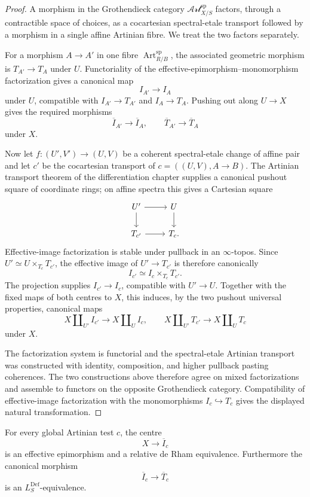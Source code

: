 \begin{proof}
A morphism in the Grothendieck category
$\mathscr{Art}^{\mathrm{sp}}_{X/S}$ factors, through a contractible space of
choices, as a cocartesian spectral-etale transport followed by a morphism in a
single affine Artinian fibre.  We treat the two factors separately.

For a morphism $A\to A'$ in one fibre
$\operatorname{Art}^{\mathrm{sp}}_{R/B}$, the associated geometric morphism is
$T_{A'}\to T_A$ under $U$.  Functoriality of the
effective-epimorphism--monomorphism factorization gives a canonical map
\[
    I_{A'}\longrightarrow I_A
\]
under $U$, compatible with $I_{A'}\to T_{A'}$ and $I_A\to T_A$.  Pushing out
along $U\to X$ gives the required morphisms
\[
    \overline I_{A'}\longrightarrow\overline I_A,
    \qquad
    \overline T_{A'}\longrightarrow\overline T_A
\]
under $X$.

Now let
$f:(U',V')\to(U,V)$ be a coherent spectral-etale change of affine pair and
let $c'$ be the cocartesian transport of
$c=((U,V),A\to B)$.  The Artinian transport theorem of the differentiation
chapter supplies a canonical pushout square of coordinate rings; on affine
spectra this gives a Cartesian square
\[
\begin{tikzcd}
U' \arrow[r] \arrow[d] & U \arrow[d]\\
T_{c'} \arrow[r] & T_c.
\end{tikzcd}
\]
Effective-image factorization is stable under pullback in an $\infty$-topos.
Since $U'\simeq U\times_{T_c}T_{c'}$, the effective image of
$U'\to T_{c'}$ is therefore canonically
\[
    I_{c'}\simeq I_c\times_{T_c}T_{c'}.
\]
The projection supplies $I_{c'}\to I_c$, compatible with $U'\to U$.  Together
with the fixed maps of both centres to $X$, this induces, by the two pushout
universal properties, canonical maps
\[
    X\amalg_{U'}I_{c'}\longrightarrow X\amalg_UI_c,
    \qquad
    X\amalg_{U'}T_{c'}\longrightarrow X\amalg_UT_c
\]
under $X$.

The factorization system is functorial and the spectral-etale Artinian
transport was constructed with identity, composition, and higher pullback
pasting coherences.  The two constructions above therefore agree on mixed
factorizations and assemble to functors on the opposite Grothendieck category.
Compatibility of effective-image factorization with the monomorphisms
$I_c\hookrightarrow T_c$ gives the displayed natural transformation.
\end{proof}

\begin{proposition}
\label{prop:bnli-induced-cell-formal-effective}
For every global Artinian test $c$, the centre
\[
    X\longrightarrow\overline I_c
\]
is an effective epimorphism and a relative de Rham equivalence.
Furthermore the canonical morphism
\[
    \overline I_c\longrightarrow\overline T_c
\]
is an $L_S^{\mathrm{Def}}$-equivalence.
\end{proposition}


